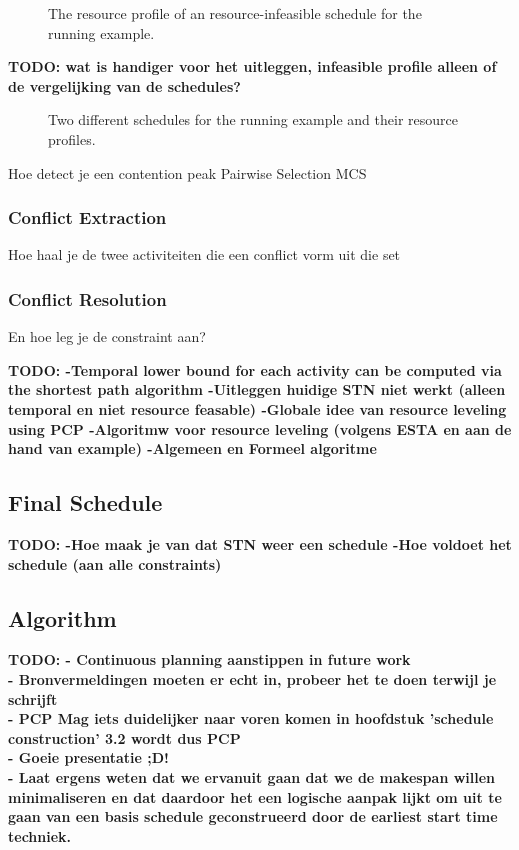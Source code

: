 \documentclass{article}
\theoremstyle{definition}
\newcommand{\inputtikz}[1]{}
\newcommand{\TODO}[1]{{\color{red}\textbf{TODO: #1}}}
\begin{document}
\begin{figure}[h]
	\centering
	\inputtikz{schedule_infeasible_profile}
	\caption{The resource profile of an resource-infeasible schedule for the running example. }
	\label{fig:resource_graph}
\end{figure}
\TODO{wat is handiger voor het uitleggen, infeasible profile alleen of de vergelijking van de schedules?}
\begin{figure}[h]
	\centering
	\inputtikz{schedule_comparison}
	\caption{Two different schedules for the running example and their resource profiles. }
	\label{fig:resource_graph}
\end{figure}



Hoe detect je een contention peak
Pairwise Selection
MCS

\subsubsection{Conflict Extraction}
Hoe haal je de twee activiteiten die een conflict vorm uit die set

\subsubsection{Conflict Resolution}
En hoe leg je de constraint aan?


\TODO{
	-Temporal lower bound for each activity can be computed via the shortest path algorithm
		-Uitleggen huidige STN niet werkt (alleen temporal en niet resource feasable)
		-Globale idee van resource leveling using PCP
		-Algoritmw voor resource leveling (volgens ESTA en aan de hand van example)
		-Algemeen en Formeel algoritme
		}

\subsection{Final Schedule}

\TODO{
		-Hoe maak je van dat STN weer een schedule
		-Hoe voldoet het schedule (aan alle constraints)
}

\subsection{Algorithm}

\newpage

\TODO{
 - Continuous planning aanstippen in future work \\
 - Bronvermeldingen moeten er echt in, probeer het te doen terwijl je schrijft \\
 - PCP Mag iets duidelijker naar voren komen in hoofdstuk 'schedule construction' 3.2 wordt dus PCP \\
 - Goeie presentatie ;D! \\
 - Laat ergens weten dat we ervanuit gaan dat we de makespan willen minimaliseren en dat daardoor het een logische aanpak lijkt om uit te gaan van een basis schedule geconstrueerd door de earliest start time techniek. \\
 }
\end{document}

